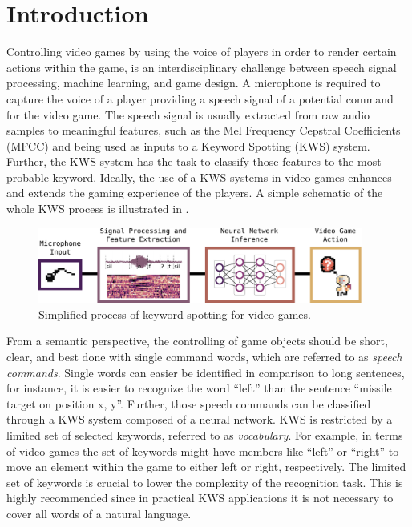 
\chapter{Introduction}\label{sec:intro}
Controlling video games by using the voice of players in order to render certain actions within the game, is an interdisciplinary challenge between speech signal processing, machine learning, and game design.
A microphone is required to capture the voice of a player providing a speech signal of a potential command for the video game.
The speech signal is usually extracted from raw audio samples to meaningful features, such as the Mel Frequency Cepstral Coefficients (MFCC) and being used as inputs to a Keyword Spotting (KWS) system.
Further, the KWS system has the task to classify those features to the most probable keyword.
Ideally, the use of a KWS systems in video games enhances and extends the gaming experience of the players.
A simple schematic of the whole KWS process is illustrated in .
\begin{figure}[!ht]
  \centering
    \includegraphics[width=0.95\textwidth]{./1_intro/figs/intro_kws.pdf}
  \caption{Simplified process of keyword spotting for video games.}
  \label{fig:intro_kws}
\end{figure}
\FloatBarrier
\noindent
From a semantic perspective, the controlling of game objects should be short, clear, and best done with single command words, which are referred to as \emph{speech commands}.
Single words can easier be identified in comparison to long sentences, for instance, it is easier to recognize the word \enquote{left} than the sentence \enquote{missile target on position x, y}.
Further, those speech commands can be classified through a KWS system composed of a neural network.
KWS is restricted by a limited set of selected keywords, referred to as \emph{vocabulary}.
For example, in terms of video games the set of keywords might have members like \enquote{left} or \enquote{right} to move an element within the game to either left or right, respectively.
The limited set of keywords is crucial to lower the complexity of the recognition task.
This is highly recommended since in practical KWS applications it is not necessary to cover all words of a natural language.

